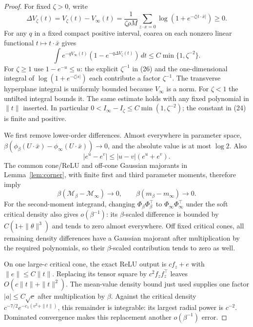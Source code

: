 \documentclass[11pt]{article}
\begin{document}
\begin{proof}
For fixed $\zeta>0$, write
\[
 \Delta V_\zeta(t)=V_\zeta(t)-V_\infty(t)
   =\frac1{\zeta\rho M}\sum_{z\cdot x=0}
                        \log(1+e^{-\zeta|t\cdot\bar x|})\ge0.
                                                               \tag{26}
\]
For any $q$ in a fixed compact positive interval, coarea on each
nonzero linear functional $t\mapsto t\cdot\bar x$ gives
\[
 \int e^{-qV_\infty(t)}(1-e^{-q\Delta V_\zeta(t)})\,dt
                              \le C\min\{1,\zeta^{-2}\}.
                                                               \tag{27}
\]
For $\zeta\ge1$ use $1-e^{-u}\le u$: the explicit $\zeta^{-1}$
in (26) and the one-dimensional integral of
$\log(1+e^{-\zeta|s|})$ each contribute a factor $\zeta^{-1}$.
The transverse hyperplane integral is uniformly bounded because
$V_\infty$ is a norm. For $\zeta<1$ the untilted integral bounds it.
The same estimate holds with any fixed polynomial in $\|t\|$ inserted.
In particular $0<I_\infty-I_\zeta\le C\min(1,\zeta^{-2})$;
the constant in (24) is finite and positive.

We first remove lower-order differences. Almost everywhere in parameter
space,
$\beta(\phi_\beta(U\cdot\bar x)-\phi_\infty(U\cdot\bar x))\to0$,
and the absolute value is at most $\log2$. Also
\[
 |e^u-e^v|\le |u-v|(e^u+e^v).
\]
The common cone/ReLU and off-cone Gaussian majorants in
Lemma~\ref{lem:corner}, with finite first and third parameter moments,
therefore imply
\[
 \beta(\mathcal M_\beta-\mathcal M_\infty)\to0,
 \qquad
 \beta(m_\beta-m_\infty)\to0.                         \tag{28}
\]
For the second-moment integrand, changing $\Phi_\beta\Phi_\beta^\top$
to $\Phi_\infty\Phi_\infty^\top$ under the soft critical density
also gives $o(\beta^{-1})$: its $\beta$-scaled difference is bounded
by $C(1+\|\theta\|^3)$ and tends to zero almost everywhere.
Off fixed critical cones, all remaining density differences have a
Gaussian majorant after multiplication by the required polynomials,
so their $\beta$-scaled contribution tends to zero as well.

On one large-$c$ critical cone, the exact ReLU output is
$cf_z+e$ with $\|e\|\le C\|t\|$. Replacing its tensor square by
$c^2f_zf_z^\top$ leaves $O(c\|t\|+\|t\|^2)$.
The mean-value density bound just used supplies one factor
$|a|\le C\sqrt c$ after multiplication by $\beta$. Against the
critical density $c^{-7/2}e^{-c_1(v^2+\|t\|)}$, this remainder is
integrable: its largest radial power is $c^{-2}$. Dominated convergence
makes this replacement another $o(\beta^{-1})$ error.


\end{proof}
\end{document}

